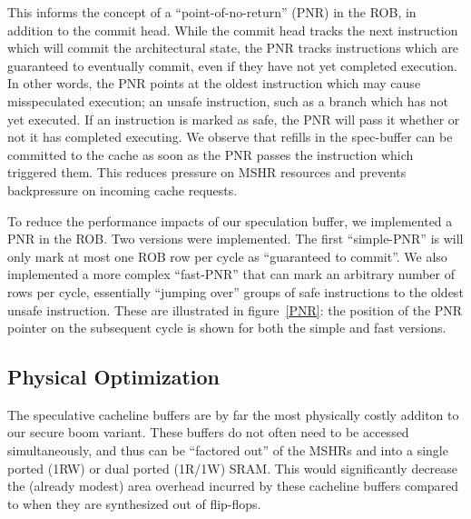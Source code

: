 This informs the concept of a ``point-of-no-return'' (PNR) in the ROB, in addition to the commit head. While the commit head tracks the next instruction which will commit the architectural state, the PNR tracks instructions which are guaranteed to eventually commit, even if they have not yet completed execution. In other words, the PNR points at the oldest instruction which may cause misspeculated execution; an unsafe instruction, such as a branch which has not yet executed. If an instruction is marked as safe, the PNR will pass it whether or not it has completed executing. We observe that refills in the spec-buffer can be committed to the cache as soon as the PNR passes the instruction which triggered them. This reduces pressure on MSHR resources and prevents backpressure on incoming cache requests.

To reduce the performance impacts of our speculation buffer, we implemented a PNR in the ROB. Two versions were implemented. The first ``simple-PNR'' is will only mark at most one ROB row per cycle as ``guaranteed to commit''. We also implemented a more complex ``fast-PNR'' that can mark an arbitrary number of rows per cycle, essentially ``jumping over'' groups of safe instructions to the oldest unsafe instruction. These are illustrated in figure~\ref{PNR}: the position of the PNR pointer on the subsequent cycle is shown for both the simple and fast versions.

\subsection{Physical Optimization}
The speculative cacheline buffers are by far the most physically costly additon to our secure boom variant. These buffers do not often need to be accessed simultaneously, and thus can be ``factored out'' of the MSHRs and into a single ported (1RW) or dual ported (1R/1W) SRAM. This would significantly decrease the (already modest) area overhead incurred by these cacheline buffers compared to when they are synthesized out of flip-flops.

